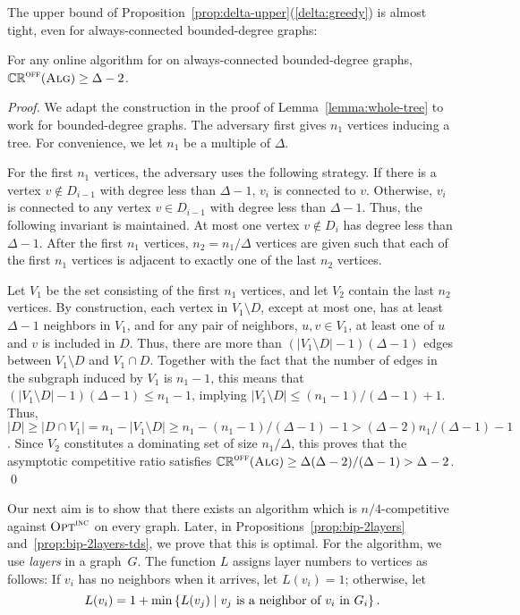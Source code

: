 The upper bound of
Proposition~\ref{prop:delta-upper}(\ref{delta:greedy}) is almost
tight, even for always-connected bounded-degree graphs:

\begin{proposition}
For any online algorithm \ALG for \ds on always-connected
bounded-degree graphs, $\mathbb{CR}^{\textsc{off}}(\operatorname{\textsc{Alg}}) \ge \Delta-2$.
\end{proposition}

\begin{proof}
We adapt the construction in the proof of
Lemma~\ref{lemma:whole-tree} to work for bounded-degree graphs. 
The adversary first gives $n_1$ vertices inducing a tree.
For convenience, we let $n_1$ be a multiple of $\Delta$.


For the first $n_1$ vertices, the adversary uses the following
strategy.
If there is a vertex $v \not\in D_{i-1}$ with degree less than
$\Delta-1$, $v_{i}$ is connected to $v$.
Otherwise, $v_{i}$ is connected to any vertex $v \in D_{i-1}$ with degree less than
$\Delta-1$.
Thus, the following invariant is maintained.
At most one vertex $v \not\in D_i$ has degree less than $\Delta-1$.
After the first $n_1$ vertices, $n_2=n_1/\Delta$ vertices are given such
that each of the first $n_1$ vertices is adjacent to exactly one of
the last $n_2$ vertices.

Let $V_1$ be the set consisting of the first $n_1$ vertices, and let
$V_2$ contain the last $n_2$ vertices.
By construction, each vertex in $V_1
\setminus D$, except at most one, has at least $\Delta-1$ neighbors in
$V_1$, and for any pair of neighbors, $u,v \in V_1$, at least
one of $u$ and $v$ is included in $D$.
Thus, there are more than $(|V_1 \setminus D|-1)(\Delta-1)$ edges
between $V_1 \setminus D$ and $V_1 \cap D$.
Together with the fact that the number of edges in the subgraph induced
by $V_1$ is $n_1-1$,
this means that $(|V_1\setminus D| -1)(\Delta - 1) \le n_1 - 1$,
implying $|V_1 \setminus D| \leq (n_1-1)/(\Delta-1)+1$.
Thus, $|D| \ge |D\cap V_1| = n_1 - |V_1\setminus D| \ge n_1 - (n_1-1)/(\Delta -1)-1
> (\Delta-2)n_1/(\Delta-1)-1$.
Since $V_2$ constitutes a dominating set of size $n_1/\Delta$, this proves that
the asymptotic competitive ratio satisfies 
$\mathbb{CR}^{\textsc{off}}(\operatorname{\textsc{Alg}}) \ge \Delta(\Delta-2)/(\Delta-1) > \Delta-2$.
\qed\end{proof}


Our next aim is to show that there exists an algorithm which is
$n/4$-competitive against $\operatorname{\textsc{Opt}}^\textsc{\ensuremath{\text{inc}}}$ on every graph.
Later, in Propositions~\ref{prop:bip-2layers} and~\ref{prop:bip-2layers-tds}, we prove that this is optimal.
For the algorithm, we use \emph{layers} in a graph~$G$.
The function $L$ assigns layer numbers to vertices as follows:
If $v_i$ has no neighbors when it arrives, let $L(v_i) = 1$; otherwise, let
$$L(v_i) = 1 + \min 
  \left\{ L(v_j)\mid \text{$v_j$ is a neighbor of $v_i$ in $G_i$}\right\}.$$

